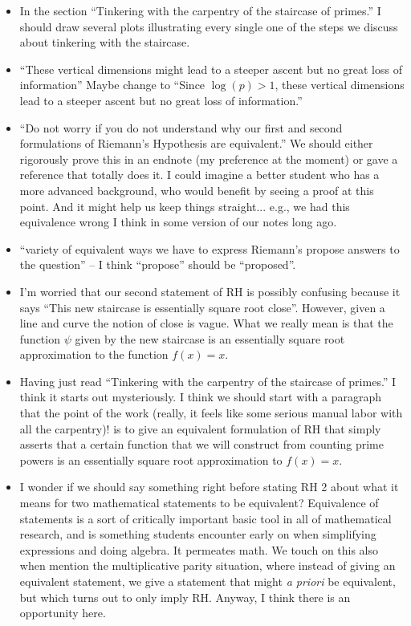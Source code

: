 \documentclass{article}
\begin{document}
\begin{itemize}
\item In the section ``Tinkering with the carpentry of the staircase
  of primes.''  I should draw several plots illustrating every single
  one of the steps we discuss about tinkering with the staircase.

\item ``These vertical dimensions might lead to a steeper ascent but
  no great loss of information'' Maybe change to ``Since $\log(p)>1$,
  these vertical dimensions lead to a steeper ascent but no great loss
  of information.''

\item ``Do not worry if you do not understand why our first and second
  formulations of Riemann's Hypothesis are equivalent.''  We should
  either rigorously prove this in an endnote (my preference at the
  moment) or gave a reference that totally does it.  I could imagine a
  better student who has a more advanced background, who would benefit
  by seeing a proof at this point.  And it might help us keep things
  straight... e.g., we had this equivalence wrong I think in some
  version of our notes long ago.

\item ``variety of equivalent ways we have to express Riemann’s
  propose answers to the question'' -- I think ``propose'' should be
  ``proposed''.

\item I'm worried that our second statement of RH is possibly
  confusing because it says ``This new staircase is essentially square
  root close''.  However, given a line and curve the notion of close
  is vague.  What we really mean is that the function $\psi$ given by
  the new staircase is an essentially square root approximation to the
  function $f(x) = x$.

\item Having just read ``Tinkering with the carpentry of the staircase
  of primes.'' I think it starts out mysteriously.  I think we should
  start with a paragraph that the point of the work (really, it feels
  like some serious manual labor with all the carpentry)! is to give
  an equivalent formulation of RH that simply asserts that a certain
  function that we will construct from counting prime powers is an
  essentially square root approximation to $f(x)=x$.

\item I wonder if we should say something right before stating RH 2
  about what it means for two mathematical statements to be
  equivalent?  Equivalence of statements is a sort of critically
  important basic tool in all of mathematical research, and is
  something students encounter early on when simplifying expressions
  and doing algebra.  It permeates math.  We touch on this also when
  mention the multiplicative parity situation, where instead of giving
  an equivalent statement, we give a statement that might {\em a
    priori} be equivalent, but which turns out to only imply RH.
  Anyway, I think there is an opportunity here.


\end{itemize}
\end{document}

